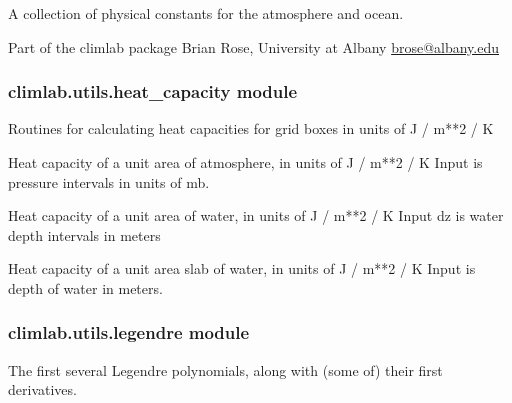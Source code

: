 \documentclass[letterpaper,10pt,english]{sphinxmanual}
\begin{document}
A collection of physical constants for the atmosphere and ocean.

Part of the climlab package
Brian Rose, University at Albany
\href{mailto:brose@albany.edu}{brose@albany.edu}


\subsubsection{climlab.utils.heat\_capacity module}
\label{api/climlab.utils:module-climlab.utils.heat_capacity}\label{api/climlab.utils:climlab-utils-heat-capacity-module}
Routines for calculating heat capacities for grid boxes
in units of J / m**2 / K

\begin{fulllineitems}
\label{api/climlab.utils:climlab.utils.heat_capacity.atmosphere}
Heat capacity of a unit area of atmosphere, in units of J / m**2 / K
Input is pressure intervals in units of mb.

\end{fulllineitems}


\begin{fulllineitems}
\label{api/climlab.utils:climlab.utils.heat_capacity.ocean}
Heat capacity of a unit area of water, in units of J / m**2 / K
Input dz is water depth intervals in meters

\end{fulllineitems}


\begin{fulllineitems}
\label{api/climlab.utils:climlab.utils.heat_capacity.slab_ocean}
Heat capacity of a unit area slab of water, in units of J / m**2 / K
Input is depth of water in meters.

\end{fulllineitems}



\subsubsection{climlab.utils.legendre module}
\label{api/climlab.utils:module-climlab.utils.legendre}\label{api/climlab.utils:climlab-utils-legendre-module}
The first several Legendre polynomials, along with 
(some of) their first derivatives.
\end{document}
